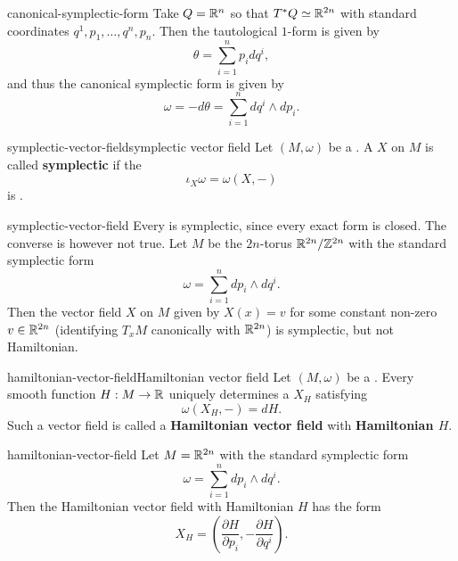 \begin{example}{canonical-symplectic-form}
    Take $Q = \mathbb{R}^n$ so that $T^* Q \simeq \mathbb{R}^{2n}$ with standard coordinates $q^1, p_1, \ldots, q^n, p_n$. Then the tautological $1$-form is given by
    \[ \theta = \sum_{i = 1}^{n} p_i dq^i , \]
    and thus the canonical symplectic form is given by
    \[ \omega = -d \theta = \sum_{i = 1}^{n} d q^i \wedge d p_i. \]
\end{example}

\begin{topic}{symplectic-vector-field}{symplectic vector field}
    Let $(M, \omega)$ be a . A  $X$ on $M$ is called \textbf{symplectic} if the 
    \[ \iota_X \omega = \omega(X, -) \]
    is .
\end{topic}

\begin{example}{symplectic-vector-field}
    Every  is symplectic, since every exact form is closed. The converse is however not true. Let $M$ be the $2n$-torus $\mathbb{R}^{2n}/\mathbb{Z}^{2n}$ with the standard symplectic form
    \[ \omega = \sum_{i = 1}^{n} dp_i \wedge dq^i . \]
    Then the vector field $X$ on $M$ given by $X(x) = v$ for some constant non-zero $v \in \mathbb{R}^{2n}$ (identifying $T_x M$ canonically with $\mathbb{R}^{2n}$) is symplectic, but not Hamiltonian.
\end{example}

\begin{topic}{hamiltonian-vector-field}{Hamiltonian vector field}
    Let $(M, \omega)$ be a . Every smooth function $H : M \to \mathbb{R}$ uniquely determines a  $X_H$ satisfying
    \[ \omega(X_H, -) = dH . \]
    Such a vector field is called a \textbf{Hamiltonian vector field} with \textbf{Hamiltonian $H$}.
\end{topic}

\begin{example}{hamiltonian-vector-field}
    Let $M = \mathbb{R}^{2n}$ with the standard symplectic form
    \[ \omega = \sum_{i = 1}^{n} dp_i \wedge dq^i . \]
    Then the Hamiltonian vector field with Hamiltonian $H$ has the form
    \[ X_H = \left(\frac{\partial H}{\partial p_i}, -\frac{\partial H}{\partial q^i} \right) . \]
\end{example}

